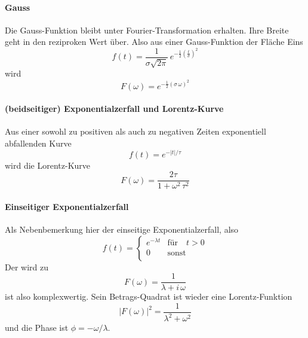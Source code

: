 \paragraph{Gauss} Die Gauss-Funktion bleibt unter Fourier-Transformation erhalten. Ihre Breite geht in den reziproken Wert über. Also aus einer Gauss-Funktion der Fläche Eins
\begin{equation}
 f(t) = \frac{1}{\sigma \sqrt{2 \pi}} \, e^{- \frac{1}{2} \left( \frac{t}{\sigma} \right)^2}
\end{equation}
wird
\begin{equation}
 F(\omega) =  e^{- \frac{1}{2} \left( \sigma \, \omega \right) ^2  }
\end{equation}



\paragraph{(beidseitiger) Exponentialzerfall und Lorentz-Kurve} Aus einer sowohl zu positiven als auch zu negativen Zeiten exponentiell abfallenden Kurve 
\begin{equation}
 f(t) = e^{- |t| / \tau}
\end{equation}
wird die Lorentz-Kurve
\begin{equation}
 F(\omega) = \frac{2 \tau}{1 + \omega^2 \, \tau^2}
\end{equation}


\paragraph{Einseitiger Exponentialzerfall} Als Nebenbemerkung hier der einseitige Exponentialzerfall, also
\begin{equation}
 f(t) = \left\{ \begin{array}{ll}
e^{- \lambda t } & \text{für} \quad t > 0 \\
 0 & \text{sonst} \\
 \end{array}
 \right.
\end{equation}
Der wird zu
\begin{equation}
 F(\omega) = \frac{1}{\lambda + i \, \omega}
\end{equation}
ist also komplexwertig. Sein Betrags-Quadrat ist wieder eine Lorentz-Funktion
\begin{equation}
| F(\omega)|^2 = \frac{1}{\lambda^2 +  \omega^2}
\end{equation}
und die Phase ist $\phi = - \omega / \lambda$.

